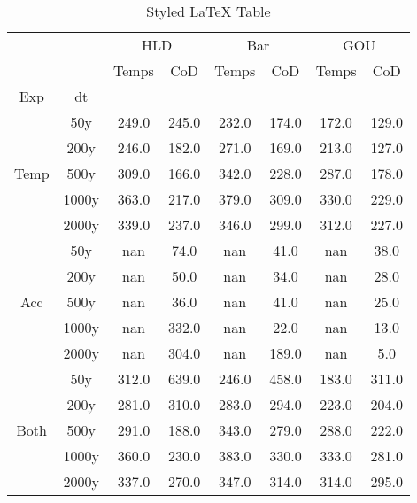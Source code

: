 \begin{table}[h]
\centering
\caption{Styled LaTeX Table}
\label{table:5}
\begin{tabular}{cccccccc}
\toprule
 &  & \multicolumn{2}{c}{HLD} & \multicolumn{2}{c}{Bar} & \multicolumn{2}{c}{GOU} \\
 &  & Temps & CoD & Temps & CoD & Temps & CoD \\
Exp & dt &  &  &  &  &  &  \\
\midrule
\multirow[c]{5}{*}{Temp} & 50y & 249.0 & 245.0 & 232.0 & 174.0 & 172.0 & 129.0 \\
 & 200y & 246.0 & 182.0 & 271.0 & 169.0 & 213.0 & 127.0 \\
 & 500y & 309.0 & 166.0 & 342.0 & 228.0 & 287.0 & 178.0 \\
 & 1000y & 363.0 & 217.0 & 379.0 & 309.0 & 330.0 & 229.0 \\
 & 2000y & 339.0 & 237.0 & 346.0 & 299.0 & 312.0 & 227.0 \\
\multirow[c]{5}{*}{Acc} & 50y & nan & 74.0 & nan & 41.0 & nan & 38.0 \\
 & 200y & nan & 50.0 & nan & 34.0 & nan & 28.0 \\
 & 500y & nan & 36.0 & nan & 41.0 & nan & 25.0 \\
 & 1000y & nan & 332.0 & nan & 22.0 & nan & 13.0 \\
 & 2000y & nan & 304.0 & nan & 189.0 & nan & 5.0 \\
\multirow[c]{5}{*}{Both} & 50y & 312.0 & 639.0 & 246.0 & 458.0 & 183.0 & 311.0 \\
 & 200y & 281.0 & 310.0 & 283.0 & 294.0 & 223.0 & 204.0 \\
 & 500y & 291.0 & 188.0 & 343.0 & 279.0 & 288.0 & 222.0 \\
 & 1000y & 360.0 & 230.0 & 383.0 & 330.0 & 333.0 & 281.0 \\
 & 2000y & 337.0 & 270.0 & 347.0 & 314.0 & 314.0 & 295.0 \\
\bottomrule
\end{tabular}
\end{table}
